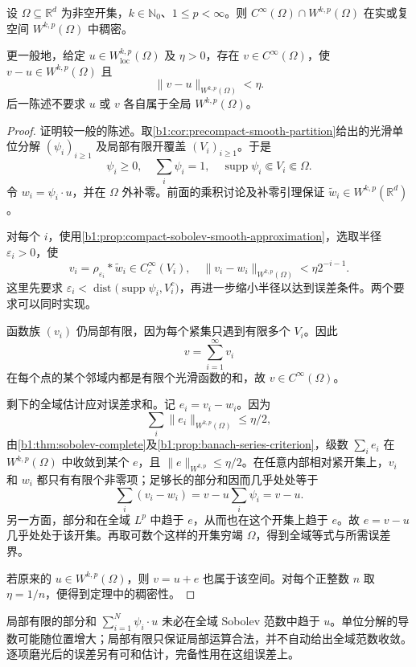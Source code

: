 \begin{theorem}\label{b1:thm:meyers-serrin}
设 \(\Omega\subseteq\mathbb R^d\) 为非空开集，\(k\in\mathbb N_0\)、\(1\leq p<\infty\)。则 \(C^\infty(\Omega)\cap W^{k,p}(\Omega)\) 在实或复空间 \(W^{k,p}(\Omega)\) 中稠密。

\ProseParagraphBreak

更一般地，给定 \(u\in W^{k,p}_{\mathrm{loc}}(\Omega)\) 及 \(\eta>0\)，存在 \(v\in C^\infty(\Omega)\)，使 \(v-u\in W^{k,p}(\Omega)\) 且
\[
 \|v-u\|_{W^{k,p}(\Omega)}<\eta.
\]
后一陈述不要求 \(u\) 或 \(v\) 各自属于全局 \(W^{k,p}(\Omega)\)。
\end{theorem}
\begin{proof}
证明较一般的陈述。取\cref{b1:cor:precompact-smooth-partition}给出的光滑单位分解 \((\psi_i)_{i\geq1}\) 及局部有限开覆盖 \((V_i)_{i\geq1}\)。于是
\[
 \psi_i\geq0,
 \quad\sum_i\psi_i=1,
 \quad\operatorname{supp}\psi_i\Subset V_i\Subset\Omega.
\]
令 \(w_i=\psi_i\cdot u\)，并在 \(\Omega\) 外补零。前面的乘积讨论及补零引理保证 \(\widetilde w_i\in W^{k,p}(\mathbb R^d)\)。

对每个 \(i\)，使用\cref{b1:prop:compact-sobolev-smooth-approximation}，选取半径 \(\varepsilon_i>0\)，使
\[
 v_i=\rho_{\varepsilon_i}*\widetilde w_i\in C_c^\infty(V_i),
 \quad
 \|v_i-w_i\|_{W^{k,p}(\Omega)}<\eta2^{-i-1}.
\]
这里先要求 \(\varepsilon_i<\operatorname{dist}\bigl(\operatorname{supp}\psi_i,V_i^c\bigr)\)，再进一步缩小半径以达到误差条件。两个要求可以同时实现。

函数族 \((v_i)\) 仍局部有限，因为每个紧集只遇到有限多个 \(V_i\)。因此
\[
 v=\sum_{i=1}^\infty v_i
\]
在每个点的某个邻域内都是有限个光滑函数的和，故 \(v\in C^\infty(\Omega)\)。

剩下的全域估计应对误差求和。记 \(e_i=v_i-w_i\)。因为
\[
 \sum_i\|e_i\|_{W^{k,p}(\Omega)}\leq\eta/2,
\]
由\cref{b1:thm:sobolev-complete}及\cref{b1:prop:banach-series-criterion}，级数 \(\sum_i e_i\) 在 \(W^{k,p}(\Omega)\) 中收敛到某个 \(e\)，且 \(\|e\|_{W^{k,p}}\leq\eta/2\)。在任意内部相对紧开集上，\(v_i\) 和 \(w_i\) 都只有有限个非零项；足够长的部分和因而几乎处处等于
\[
 \sum_i(v_i-w_i)=v-u\sum_i\psi_i=v-u.
\]
另一方面，部分和在全域 \(L^p\) 中趋于 \(e\)，从而也在这个开集上趋于 \(e\)。故 \(e=v-u\) 几乎处处于该开集。再取可数个这样的开集穷竭 \(\Omega\)，得到全域等式与所需误差界。

若原来的 \(u\in W^{k,p}(\Omega)\)，则 \(v=u+e\) 也属于该空间。对每个正整数 \(n\) 取 \(\eta=1/n\)，便得到定理中的稠密性。
\end{proof}

局部有限的部分和 \(\sum_{i=1}^N\psi_i\cdot u\) 未必在全域 Sobolev 范数中趋于 \(u\)。单位分解的导数可能随位置增大；局部有限只保证局部运算合法，并不自动给出全域范数收敛。逐项磨光后的误差另有可和估计，完备性用在这组误差上。

